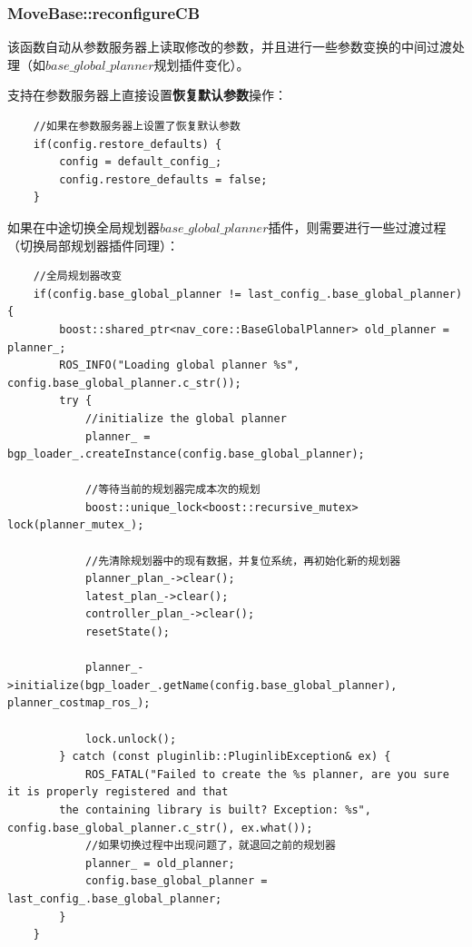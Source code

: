 \documentclass[9pt, oneside]{book}
\begin{document}
\subsubsection{MoveBase::reconfigureCB}

该函数自动从参数服务器上读取修改的参数，并且进行一些参数变换的中间过渡处理（如$base\_global\_planner$规划插件变化）。

支持在参数服务器上直接设置\textbf{恢复默认参数}操作：

\begin{verbatim}
    //如果在参数服务器上设置了恢复默认参数
    if(config.restore_defaults) {
        config = default_config_;
        config.restore_defaults = false;
    }
\end{verbatim}

如果在中途切换全局规划器$base\_global\_planner$插件，则需要进行一些过渡过程（切换局部规划器插件同理）：

\footnotesize
\begin{verbatim}
    //全局规划器改变
    if(config.base_global_planner != last_config_.base_global_planner) {
        boost::shared_ptr<nav_core::BaseGlobalPlanner> old_planner = planner_;
        ROS_INFO("Loading global planner %s", config.base_global_planner.c_str());
        try {
            //initialize the global planner
            planner_ = bgp_loader_.createInstance(config.base_global_planner);

            //等待当前的规划器完成本次的规划
            boost::unique_lock<boost::recursive_mutex> lock(planner_mutex_);

            //先清除规划器中的现有数据，并复位系统，再初始化新的规划器
            planner_plan_->clear();
            latest_plan_->clear();
            controller_plan_->clear();
            resetState();

            planner_->initialize(bgp_loader_.getName(config.base_global_planner), planner_costmap_ros_);

            lock.unlock();
        } catch (const pluginlib::PluginlibException& ex) {
            ROS_FATAL("Failed to create the %s planner, are you sure it is properly registered and that 
        the containing library is built? Exception: %s", config.base_global_planner.c_str(), ex.what());
            //如果切换过程中出现问题了，就退回之前的规划器
            planner_ = old_planner;
            config.base_global_planner = last_config_.base_global_planner;
        }
    }
\end{verbatim}
\normalsize
\end{document}
